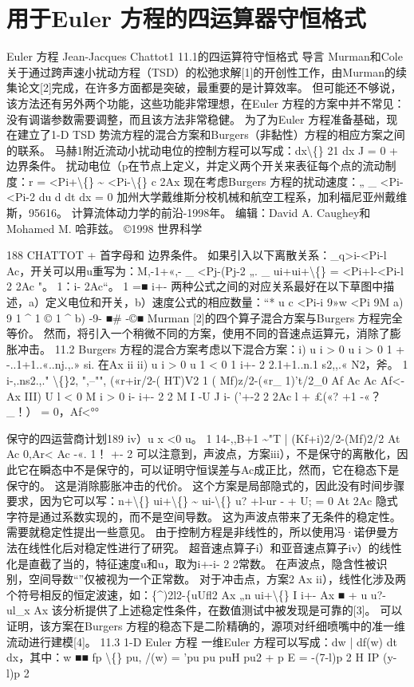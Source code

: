 \documentclass[UTF8,11pt,a4paper,openany,fontset=fandol]{ctexbook}
\begin{document}
\chapter{用于Euler 方程的四运算器守恒格式}
Euler 方程 Jean-Jacques Chattot1 11.1的四运算符守恒格式 导言 Murman和Cole关于通过跨声速小扰动方程（TSD）的松弛求解[1]的开创性工作，由Murman的续集论文[2]完成，在许多方面都是突破，最重要的是计算效率。 但可能还不够说，该方法还有另外两个功能，这些功能非常理想，在Euler 方程的方案中并不常见：没有调谐参数需要调整，而且该方法非常稳健。 为了为Euler 方程准备基础，现在建立了1-D TSD 势流方程的混合方案和Burgers（非黏性）方程的相应方案之间的联系。 马赫1附近流动小扰动电位的控制方程可以写成：dx\textbackslash\{\} 21 dx J = 0 + 边界条件。 扰动电位（p在节点上定义，并定义两个开关来表征每个点的流动制度：r = <Pi+\textbackslash\{\} \textasciitilde{} <Pi-\textbackslash\{\} c 2Ax 现在考虑Burgers 方程的扰动速度：„ \_ <Pi-<Pi-2 du d dt dx = 0 加州大学戴维斯分校机械和航空工程系，加利福尼亚州戴维斯，95616。 计算流体动力学的前沿-1998年。 编辑：David A. Caughey和Mohamed M. 哈菲兹。 ©1998 世界科学

188 CHATTOT + 首字母和 边界条件。 如果引入以下离散关系：\_q>i-<Pi-l Ac，开关可以用u重写为：M,-1+«,- \_ <Pj-(Pj-2 „. \_ ui+ui+\textbackslash\{\} = <Pi+l-<Pi-l 2 2Ac "。 1：i- 2Ac“。 1 =■ i+- 两种公式之间的对应关系最好在以下草图中描述，a）定义电位和开关，b）速度公式的相应数量：“* u c <Pi-i 9»w <Pi 9M a) 9 1 \textasciicircum{} 1 © 1 \textasciicircum{} b) -9- ■\# -©■ Murman [2]的四个算子混合方案与Burgers 方程完全等价。 然而，将引入一个稍微不同的方案，使用不同的音速点运算元，消除了膨胀冲击。 11.2 Burgers 方程的混合方案考虑以下混合方案：i) u i > 0 u i > 0 1 + -..1+1..«..nj.,.» si. 在Ax ii ii) u i > 0 u 1 < 0 1 i+- 2 2.1+1..n.1 s2,,.« N2，斧。 1 i-,.ns2.,." \textbackslash\{\}2, ",--"", («r+ir/2-( HT)V2 1 ( Mf)z/2-(«r\_ 1)'t/2\_0 Af Ac Ac Af<- Ax III) U l < 0 M i > 0 i- i+- 2 2 M I -U J i- ('+-2 2 2Ac l + £(«? +1 -«？ \_！） = 0，Af<°°

保守的四运营商计划189 iv）u x <0 u。 1 14-,,B+1 \textasciitilde{}"T | (Kf+i)2/2-(Mf)2/2 At Ac 0,Ar< Ac -«. 1！ +- 2 可以注意到，声波点，方案iii），不是保守的离散化，因此它在瞬态中不是保守的，可以证明守恒误差与Ac成正比，然而，它在稳态下是保守的。 这是消除膨胀冲击的代价。 这个方案是局部隐式的，因此没有时间步骤要求，因为它可以写：n+\textbackslash\{\} ui+\textbackslash\{\} \textasciitilde{} ui-\textbackslash\{\} u? +l-ur - + U; = 0 At 2Ac 隐式字符是通过系数实现的，而不是空间导数。 这为声波点带来了无条件的稳定性。 需要就稳定性提出一些意见。 由于控制方程是非线性的，所以使用冯·诺伊曼方法在线性化后对稳定性进行了研究。 超音速点算子i）和亚音速点算子iv）的线性化是直截了当的，特征速度u和u，取为i+-i- 2 2常数。 在声波点，隐含性被识别，空间导数“”仅被视为一个正常数。 对于冲击点，方案2 Ax ii），线性化涉及两个符号相反的恒定波速，如：\{\textasciicircum{})2l2-\{uUfl2 Ax „n ui+\textbackslash\{\} I i+- Ax ■ + u u?-ul\_x Ax 该分析提供了上述稳定性条件，在数值测试中被发现是可靠的[3]。 可以证明，该方案在Burgers 方程的稳态下是二阶精确的，源项对纤细喷嘴中的准一维流动进行建模[4]。 11.3 1-D Euler 方程 一维Euler 方程可以写成：dw | df(w) dt dx，其中：w ■■ fp \textbackslash\{\} pu, /(w) = 'pu pu puH pu2 + p E = -(7-l)p 2 H IP (y-l)p 2
\end{document}
